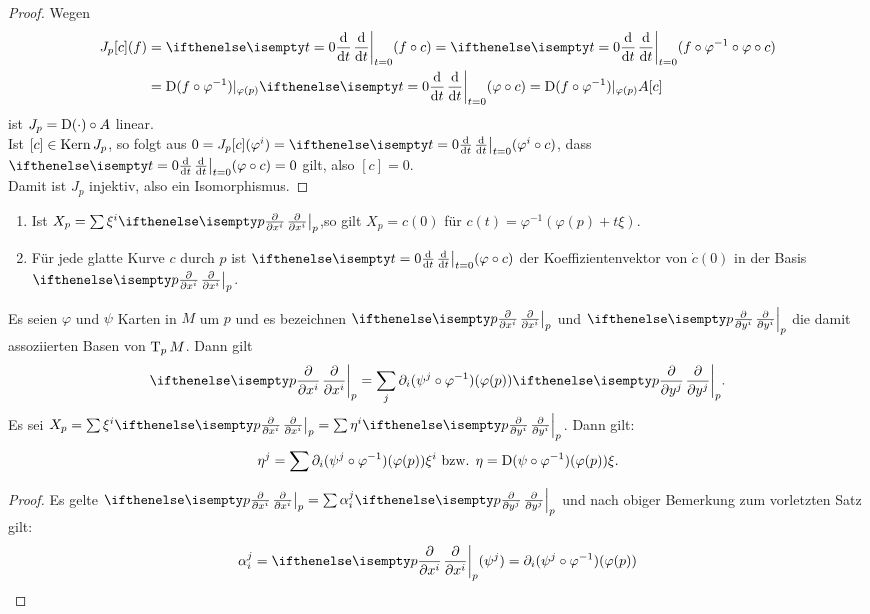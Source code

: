 \begin{proof}
  Wegen
  \begin{align*}
    J_p[c](f)& = \difffrac[t=0]{}{t}(f\circ c) = \difffrac[t=0]{}{t}(f \circ \varphi^{-1} \circ \varphi \circ c)\\
    &  = \D(f \circ \varphi^{-1})|_{\varphi(p)} \difffrac[t=0]{}{t} (\varphi \circ c) = \D (f\circ \varphi^{-1})|_{\varphi(p)}A[c]
  \end{align*}
  ist $J_p = \operatorname{D}(\cdot)\circ A$ linear.\\

  Ist $[c] \in \operatorname{Kern} J_p$, so folgt aus $0 = J_p[c](\varphi^i) = \difffrac[t=0]{}{t}(\varphi^i \circ c)$, dass $\difffrac[t=0]{}{t}(\varphi \circ c) = 0$ gilt, also $[c] = 0$.\\

  Damit ist $J_p$ injektiv, also ein Isomorphismus.
\end{proof}

\begin{bem}
  \begin{enumerate}
  \item Ist $X_p = \sum \xi^i\pdifffrac[p]{}{x^i}$,so gilt $X_p = c(0)$ für $c(t) = \varphi^{-1}(\varphi(p) + t\xi)$.
\item Für jede glatte Kurve $c$ durch $p$ ist $\difffrac[t=0]{}{t}(\varphi \circ c)$ der Koeffizientenvektor von $\dot c(0)$ in der Basis $\pdifffrac[p]{}{x^i}$.
  \end{enumerate}
\end{bem}


\begin{satz}
  Es seien $\varphi$ und $\psi$ Karten in $M$ um $p$ und es bezeichnen $\pdifffrac[p]{}{x^i}$ und $\pdifffrac[p]{}{y^i}$ die damit assoziierten Basen von $\operatorname{T}_pM$. Dann gilt
  \begin{align*}
    \pdifffrac[p]{}{x^i} = \sum_j \partial_i(\psi^j \circ \varphi^{-1})(\varphi(p)) \pdifffrac[p]{}{y^j}.
  \end{align*}
Es sei $X_p = \sum \xi^i \pdifffrac[p]{}{x^i} = \sum \eta^i\pdifffrac[p]{}{y^i}$. Dann gilt:
\begin{align*}
  \eta^j = \sum \partial_i(\psi^j \circ \varphi^{-1})(\varphi(p))\xi^i \text{ bzw. }
  \eta = \operatorname{D}(\psi \circ \varphi^{-1})(\varphi(p))\xi.
\end{align*}
\end{satz}

\begin{proof}
  Es gelte $\pdifffrac[p]{}{x^i} = \sum \alpha_i^j\pdifffrac[p]{}{y^j}$ und nach obiger Bemerkung zum vorletzten Satz gilt:
  \begin{align*}
    \alpha_i^j = \pdifffrac[p]{}{x^i}(\psi^j) = \partial_i(\psi^j \circ \varphi^{-1})(\varphi(p))
  \end{align*}
\end{proof}


